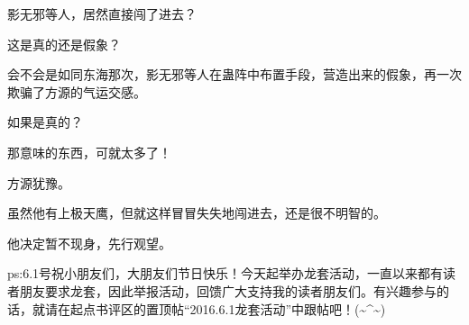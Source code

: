 \begin{this_body}
影无邪等人，居然直接闯了进去？

这是真的还是假象？

会不会是如同东海那次，影无邪等人在蛊阵中布置手段，营造出来的假象，再一次欺骗了方源的气运交感。

如果是真的？

那意味的东西，可就太多了！

方源犹豫。

虽然他有上极天鹰，但就这样冒冒失失地闯进去，还是很不明智的。

他决定暂不现身，先行观望。

ps:6.1号祝小朋友们，大朋友们节日快乐！今天起举办龙套活动，一直以来都有读者朋友要求龙套，因此举报活动，回馈广大支持我的读者朋友们。有兴趣参与的话，就请在起点书评区的置顶帖“2016.6.1龙套活动”中跟帖吧！(\~{}\^{}\~{})

\end{this_body}

